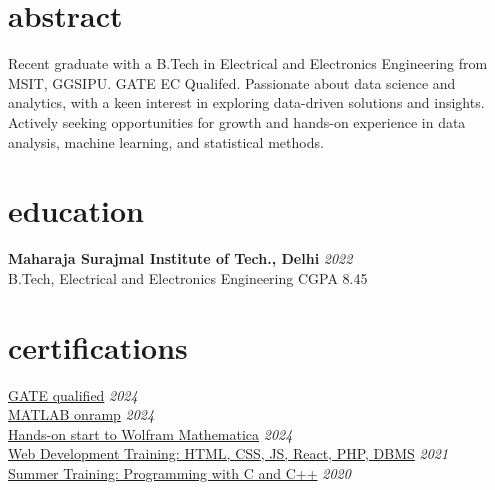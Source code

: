 \documentclass[12pt]{article}
\newcommand{\entry}[4]{{{\textbf{#1}}} \hfill \textit{#3} \\ {\footnotesize #2 \hfill #4} \\}
\newcommand{\display}[3]{\footnotesize \href {#2}{#1} \hfill \textit{#3} \\}
\begin{document}
\begin{paracol}{2}
\switchcolumn


\section{abstract}
Recent graduate with a B.Tech in Electrical and Electronics Engineering from MSIT, GGSIPU. GATE EC Qualifed. Passionate about data science and analytics, with a keen interest in exploring data-driven solutions and insights. Actively seeking opportunities for growth and hands-on experience in data analysis, machine learning, and statistical methods. 




\section{education}

\entry{Maharaja Surajmal Institute of Tech., Delhi}{B.Tech, Electrical and Electronics Engineering}{2022}{CGPA 8.45}



\section{certifications}
\display{GATE qualified}{https://drive.google.com/file/d/1shcvrExVXRHoQDvvzEtomb_LwSz4b1zZ/view?usp=sharing}{2024}
\display{MATLAB onramp}{https://drive.google.com/file/d/1mkDalK8A1keLxXXYWNhQnshTT9sq1vor/view?usp=sharing}{2024}
\display{Hands-on start to Wolfram Mathematica}{https://drive.google.com/file/d/1UMcH0YTn9qbdHo8LIr4tHWEiZi-Xrejt/view?usp=sharing}{2024}
\display{Web Development Training: HTML, CSS, JS, React, PHP, DBMS}{https://drive.google.com/file/d/1BNM1FAxmFkPRrkxTPHEAF5gk_rhXNg5g/view?usp=sharing}{2021}
\display{Summer Training: Programming with C and C++}{https://drive.google.com/file/d/190HRy9cnmwrG0kCt_TeKr5rngykm1PkW/view?usp=sharing}{2020}



\end{paracol}
\end{document}
